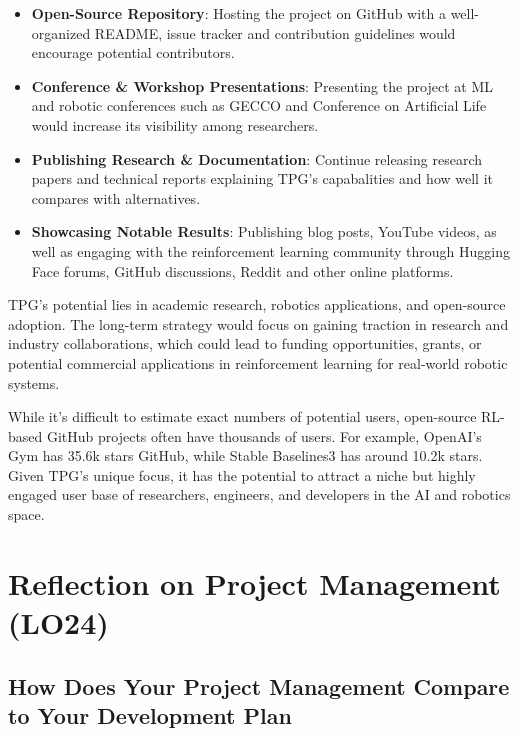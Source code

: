 \documentclass{article}
\begin{document}
\begin{itemize}
    \item \textbf{Open-Source Repository}: Hosting the project on GitHub with a well-organized README, issue tracker and contribution
        guidelines would encourage potential contributors.
    \item \textbf{Conference \& Workshop Presentations}: Presenting the project at ML and robotic conferences such as GECCO and Conference
        on Artificial Life would increase its visibility among researchers.
    \item \textbf{Publishing Research \& Documentation}: Continue releasing research papers and technical reports explaining TPG's 
        capabalities and how well it compares with alternatives.
    \item \textbf{Showcasing Notable Results}: Publishing blog posts, YouTube videos, as well as engaging with the reinforcement learning community
        through Hugging Face forums, GitHub discussions, Reddit and other online platforms. 
\end{itemize}

TPG's potential lies in academic research, robotics applications, and open-source adoption. The long-term strategy 
would focus on gaining traction in research and industry collaborations, which could lead to funding opportunities, 
grants, or potential commercial applications in reinforcement learning for real-world robotic systems.

While it's difficult to estimate exact numbers of potential users, open-source RL-based GitHub projects often have
thousands of users. For example, OpenAI's Gym has 35.6k stars GitHub, while Stable Baselines3 has around 10.2k stars. Given 
TPG's unique focus, it has the potential to attract a niche but highly engaged user base of researchers, engineers, 
and developers in the AI and robotics space.

\section{Reflection on Project Management (LO24)}


\subsection{How Does Your Project Management Compare to Your Development Plan}
\end{document}
